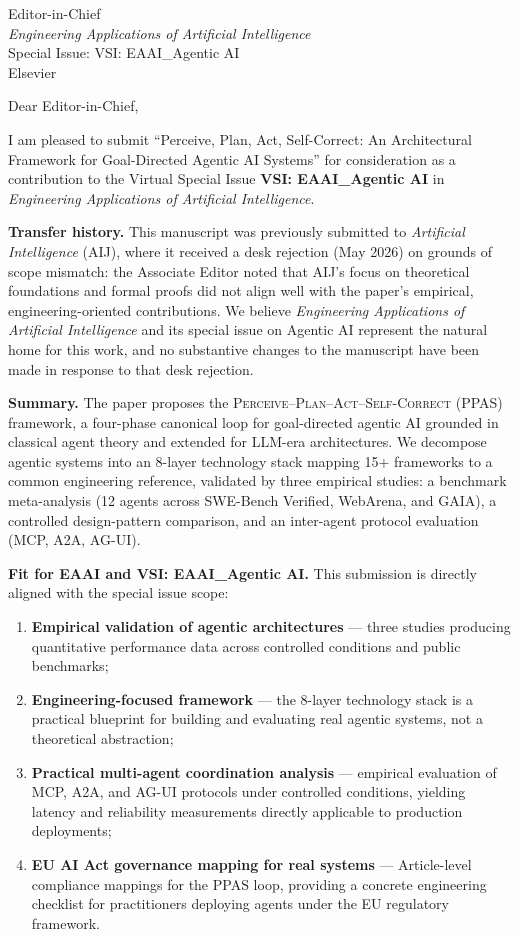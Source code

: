\documentclass[10pt]{letter}
\date{May 5, 2026}
\begin{document}
\begin{letter}{Editor-in-Chief\\
\emph{Engineering Applications of Artificial Intelligence}\\
Special Issue: VSI: EAAI\_Agentic AI\\
Elsevier}

\opening{Dear Editor-in-Chief,}

I am pleased to submit ``Perceive, Plan, Act, Self-Correct: An Architectural Framework for Goal-Directed Agentic AI Systems'' for consideration as a contribution to the Virtual Special Issue \textbf{VSI: EAAI\_Agentic AI} in \emph{Engineering Applications of Artificial Intelligence}.

\textbf{Transfer history.}\quad
This manuscript was previously submitted to \emph{Artificial Intelligence} (AIJ), where it received a desk rejection (May 2026) on grounds of scope mismatch: the Associate Editor noted that AIJ's focus on theoretical foundations and formal proofs did not align well with the paper's empirical, engineering-oriented contributions. We believe \emph{Engineering Applications of Artificial Intelligence} and its special issue on Agentic AI represent the natural home for this work, and no substantive changes to the manuscript have been made in response to that desk rejection.

\textbf{Summary.}\quad
The paper proposes the \textsc{Perceive--Plan--Act--Self-Correct} (PPAS) framework, a four-phase canonical loop for goal-directed agentic AI grounded in classical agent theory and extended for LLM-era architectures. We decompose agentic systems into an 8-layer technology stack mapping 15+ frameworks to a common engineering reference, validated by three empirical studies: a benchmark meta-analysis (12 agents across SWE-Bench Verified, WebArena, and GAIA), a controlled design-pattern comparison, and an inter-agent protocol evaluation (MCP, A2A, AG-UI).

\textbf{Fit for EAAI and VSI: EAAI\_Agentic AI.}\quad
This submission is directly aligned with the special issue scope:
\begin{enumerate}[nosep, leftmargin=1.5em]
    \item \textbf{Empirical validation of agentic architectures} --- three studies producing quantitative performance data across controlled conditions and public benchmarks;
    \item \textbf{Engineering-focused framework} --- the 8-layer technology stack is a practical blueprint for building and evaluating real agentic systems, not a theoretical abstraction;
    \item \textbf{Practical multi-agent coordination analysis} --- empirical evaluation of MCP, A2A, and AG-UI protocols under controlled conditions, yielding latency and reliability measurements directly applicable to production deployments;
    \item \textbf{EU AI Act governance mapping for real systems} --- Article-level compliance mappings for the PPAS loop, providing a concrete engineering checklist for practitioners deploying agents under the EU regulatory framework.
\end{enumerate}


\end{letter}
\end{document}
